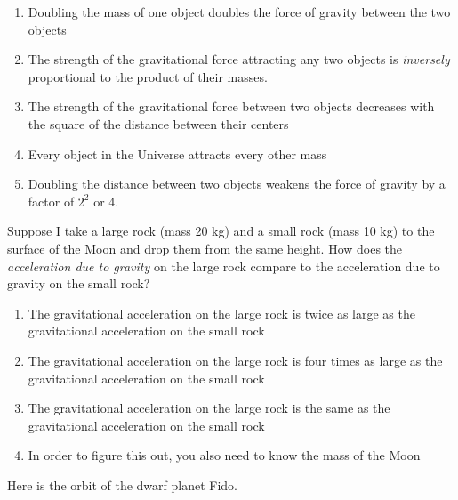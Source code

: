 \documentclass[12pt]{article}
\begin{document}
\begin{enumerate}
\begin{minipage}{\textwidth}
{\begin{enumerate}[label=(\Alph*)]
\setlength\itemsep{0.0em}
\item{ Doubling the mass of one object doubles the force of gravity between the two objects	 }
\item{ The strength of the gravitational force attracting any two objects is {\it inversely} proportional to the product of their masses. }
\item{ The strength of the gravitational force between two objects decreases with the square of the distance between their centers }
\item{ Every object in the Universe attracts every other mass  }
\item{ Doubling the distance between two objects weakens the force of gravity by a factor of $2^2$ or 4. }
\end{enumerate}
} %
\end{minipage}


\vspace{0.5in}

\begin{minipage}{\textwidth}
\item{Suppose I take a large rock (mass 20 kg) and a small rock (mass 10 kg) to the surface of the Moon and drop them from the same height.
How does the {\it acceleration due to gravity} on the large rock compare to the acceleration due to gravity on the small rock?

\begin{enumerate}[label=(\Alph*)]
\setlength\itemsep{0.0em}
\item{ The gravitational acceleration on the large rock is twice as large as the gravitational acceleration on the small rock }
\item{ The gravitational acceleration on the large rock is four times as large as the gravitational acceleration on the small rock }
\item{ The gravitational acceleration on the large rock is the same as the gravitational acceleration on the small rock }
\item{ In order to figure this out, you also need to know the mass of the Moon }
\end{enumerate}
} %
\end{minipage}


\vspace{0.5in}

\begin{minipage}{\textwidth}
\item{Here is the orbit of the dwarf planet Fido.

}
\end{minipage}
\end{enumerate}
\end{document}
